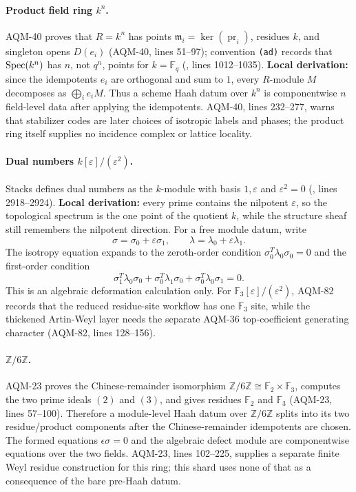\paragraph{Product field ring \(k^n\).}
AQM-40 proves that \(R=k^n\) has points
\(\mathfrak m_i=\ker(\operatorname{pr}_i)\), residues \(k\), and singleton
opens \(D(e_i)\) (AQM-40, lines 51--97); convention \texttt{(ad)} records that
\(\operatorname{Spec}(k^n)\) has \(n\), not \(q^n\), points for \(k=\mathbb F_q\)
(, lines 1012--1035).  \textbf{Local derivation:} since
the idempotents \(e_i\) are orthogonal and sum to \(1\), every \(R\)-module
\(M\) decomposes as \(\bigoplus_i e_iM\).  Thus a scheme Haah datum over
\(k^n\) is componentwise \(n\) field-level data after applying the idempotents.
AQM-40, lines 232--277, warns that stabilizer codes are later choices of
isotropic labels and phases; the product ring itself supplies no incidence
complex or lattice locality.

\paragraph{Dual numbers \(k[\varepsilon]/(\varepsilon^2)\).}
Stacks defines dual numbers as the \(k\)-module with basis \(1,\varepsilon\)
and \(\varepsilon^2=0\)
(, lines
2918--2924).  \textbf{Local derivation:} every prime contains the nilpotent
\(\varepsilon\), so the topological spectrum is the one point of the quotient
\(k\), while the structure sheaf still remembers the nilpotent direction.
For a free module datum, write
\[
  \sigma=\sigma_0+\varepsilon\sigma_1,\qquad
  \lambda=\lambda_0+\varepsilon\lambda_1 .
\]
The isotropy equation expands to the zeroth-order condition
\(\sigma_0^T\lambda_0\sigma_0=0\) and the first-order condition
\[
  \sigma_1^T\lambda_0\sigma_0+
  \sigma_0^T\lambda_1\sigma_0+
  \sigma_0^T\lambda_0\sigma_1=0 .
\]
This is an algebraic deformation calculation only.  For
\(\mathbb F_3[\varepsilon]/(\varepsilon^2)\), AQM-82 records that the reduced
residue-site workflow has one \(\mathbb F_3\) site, while the thickened
Artin-Weyl layer needs the separate AQM-36 top-coefficient generating
character (AQM-82, lines 128--156).

\paragraph{\(\mathbb Z/6\mathbb Z\).}
AQM-23 proves the Chinese-remainder isomorphism
\(\mathbb Z/6\mathbb Z\cong\mathbb F_2\times\mathbb F_3\), computes the two
prime ideals \((2)\) and \((3)\), and gives residues \(\mathbb F_2\) and
\(\mathbb F_3\) (AQM-23, lines 57--100).  Therefore a module-level Haah datum
over \(\mathbb Z/6\mathbb Z\) splits into its two residue/product components
after the Chinese-remainder idempotents are chosen.  The formed equations
\(\epsilon\sigma=0\) and the algebraic defect module are componentwise
equations over the two fields.  AQM-23, lines 102--225, supplies a separate
finite Weyl residue construction for this ring; this shard uses none of that
as a consequence of the bare pre-Haah datum.

